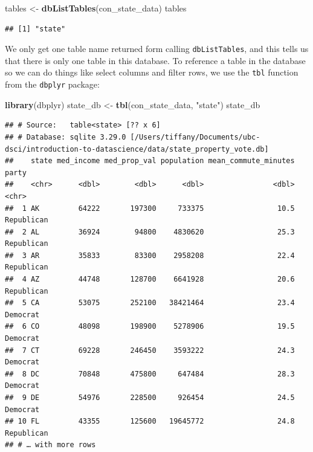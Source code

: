 \documentclass[
]{article}
\newenvironment{Shaded}{\begin{snugshade}}{\end{snugshade}}
\newcommand{\KeywordTok}[1]{\textcolor[rgb]{0.13,0.29,0.53}{\textbf{#1}}}
\newcommand{\NormalTok}[1]{#1}
\newcommand{\StringTok}[1]{\textcolor[rgb]{0.31,0.60,0.02}{#1}}
\begin{document}
\begin{Shaded}
\begin{Highlighting}[]
\NormalTok{tables <{-}}\StringTok{ }\KeywordTok{dbListTables}\NormalTok{(con\_state\_data)}
\NormalTok{tables}
\end{Highlighting}
\end{Shaded}

\begin{verbatim}
## [1] "state"
\end{verbatim}

We only get one table name returned form calling \texttt{dbListTables},
and this tells us that there is only one table in this database. To
reference a table in the database so we can do things like select
columns and filter rows, we use the \texttt{tbl} function from the
\texttt{dbplyr} package:

\begin{Shaded}
\begin{Highlighting}[]
\KeywordTok{library}\NormalTok{(dbplyr)}
\NormalTok{state\_db <{-}}\StringTok{ }\KeywordTok{tbl}\NormalTok{(con\_state\_data, }\StringTok{"state"}\NormalTok{)}
\NormalTok{state\_db}
\end{Highlighting}
\end{Shaded}

\begin{verbatim}
## # Source:   table<state> [?? x 6]
## # Database: sqlite 3.29.0 [/Users/tiffany/Documents/ubc-dsci/introduction-to-datascience/data/state_property_vote.db]
##    state med_income med_prop_val population mean_commute_minutes party     
##    <chr>      <dbl>        <dbl>      <dbl>                <dbl> <chr>     
##  1 AK         64222       197300     733375                 10.5 Republican
##  2 AL         36924        94800    4830620                 25.3 Republican
##  3 AR         35833        83300    2958208                 22.4 Republican
##  4 AZ         44748       128700    6641928                 20.6 Republican
##  5 CA         53075       252100   38421464                 23.4 Democrat  
##  6 CO         48098       198900    5278906                 19.5 Democrat  
##  7 CT         69228       246450    3593222                 24.3 Democrat  
##  8 DC         70848       475800     647484                 28.3 Democrat  
##  9 DE         54976       228500     926454                 24.5 Democrat  
## 10 FL         43355       125600   19645772                 24.8 Republican
## # … with more rows
\end{verbatim}
\end{document}

